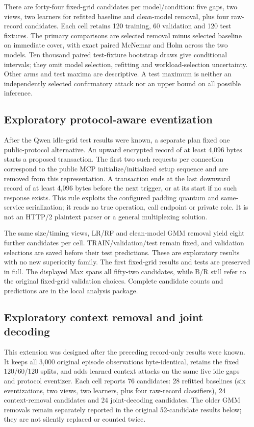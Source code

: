 There are forty-four fixed-grid candidates per model/condition: five gaps, two views, two learners for refitted baseline and clean-model removal, plus four raw-record candidates. Each cell retains 120 training, 60 validation and 120 test fixtures. The primary comparisons are selected removal minus selected baseline on immediate cover, with exact paired McNemar and Holm across the two models. Ten thousand paired test-fixture bootstrap draws give conditional intervals; they omit model selection, refitting and workload-selection uncertainty. Other arms and test maxima are descriptive. A test maximum is neither an independently selected confirmatory attack nor an upper bound on all possible inference.

\subsection{Exploratory protocol-aware eventization}
After the Qwen idle-grid test results were known, a separate plan fixed one public-protocol alternative. An upward encrypted record of at least 4,096 bytes starts a proposed transaction. The first two such requests per connection correspond to the public MCP initialize/initialized setup sequence and are removed from this representation. A transaction ends at the last downward record of at least 4,096 bytes before the next trigger, or at its start if no such response exists. This rule exploits the configured padding quantum and same-service serialization; it reads no true operation, call endpoint or private role. It is not an HTTP/2 plaintext parser or a general multiplexing solution.

The same size/timing views, LR/RF and clean-model GMM removal yield eight further candidates per cell. TRAIN/validation/test remain fixed, and validation selections are saved before their test predictions. These are exploratory results with no new superiority family. The first fixed-grid results and tests are preserved in full. The displayed Max spans all fifty-two candidates, while B/R still refer to the original fixed-grid validation choices. Complete candidate counts and predictions are in the local analysis package.

\subsection{Exploratory context removal and joint decoding}\label{supp:record-context}
This extension was designed after the preceding record-only results were known. It keeps all 3,000 original episode observations byte-identical, retains the fixed 120/60/120 splits, and adds learned context attacks on the same five idle gaps and protocol eventizer. Each cell reports 76 candidates: 28 refitted baselines (six eventizations, two views, two learners, plus four raw-record classifiers), 24 context-removal candidates and 24 joint-decoding candidates. The older GMM removals remain separately reported in the original 52-candidate results below; they are not silently replaced or counted twice.

